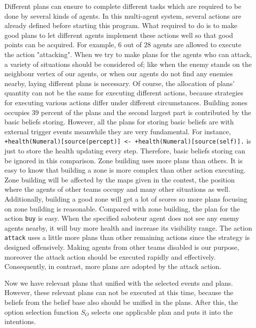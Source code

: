 Different plans can ensure to complete different tasks which are required to be done by several kinds of agents. In this multi-agent system, several actions are already defined before starting this program. What required to do is to make good plans to let different agents implement these actions well so that good points can be acquired. For example, 6 out of 28 agents are allowed to execute the action "attacking". When we try to make plans for the agents who can attack, a variety of situations should be considered of; like when the enemy stands on the neighbour vertex of our agents, or when our agents do not find any enemies nearby, laying different plans is necessary. Of course, the allocation of plans' quantity can not be the same for executing different actions, because strategies for executing various actions differ under different circumstances. Building zones occupies 39 percent of the plans and the second largest part is contributed by the basic beliefs storing. However, all the plans for storing basic beliefs are with external trigger events meanwhile they are very fundamental. For instance, \texttt{+health(Numeral)[source(percept)] <- +health(Numeral)[source(self)].} is just to store the health updating every step.
Therefore, basic beliefs storing can be ignored in this comparison. Zone building uses more plans than others. It is easy to know that building a zone is more complex than other action executing. Zone building will be affected by the maps given in the contest, the position where the agents of other teams occupy and many other situations as well. Additionally, building a good zone will get a lot of scores so more plans focusing on zone building is reasonable. Compared with zone building, the plan for the action \texttt{buy} is easy. When the specified saboteur agent does not see any enemy agents nearby, it will buy more health and increase its visibility range.
The action \texttt{attack} uses a little more plans than other remaining actions since the strategy is designed offensively. Making agents from other teams disabled is our purpose, moreover the attack action should be executed rapidly and effectively. Consequently, in contrast, more plans are adopted by the attack action.

Now we have relevant plans that unified with the selected events and plans. However, these relevant plans can not be executed at this time, because the beliefs from the belief base also should be unified in the plans. After this, the option selection function $S_O$ selects one applicable plan and puts it into the intentions.

